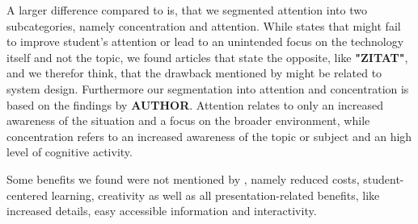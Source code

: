 A larger difference compared to \cite{Radu.2014} is, that we segmented attention into two subcategories, namely concentration and attention. While \cite{Radu.2014} states that \AR \apps might fail to improve student's attention or lead to an unintended focus on the technology itself and not the topic\autocite[cf.][314]{Radu.2014}, we found articles that state the opposite, like \textbf{"ZITAT"}, and we therefor think, that the drawback mentioned by \cite{Radu.2014} might be related to system design. Furthermore our segmentation into attention and concentration is based on the findings by \textbf{AUTHOR}. Attention relates to only an increased awareness of the situation and a focus on the broader environment, while concentration refers to an increased awareness of the topic or subject and an high level of cognitive activity.
%
% 

Some benefits we found were not mentioned by \cite{Radu.2014}, namely reduced costs, student-centered learning, creativity as well as all presentation-related benefits, like increased details, easy accessible information and interactivity.\\


